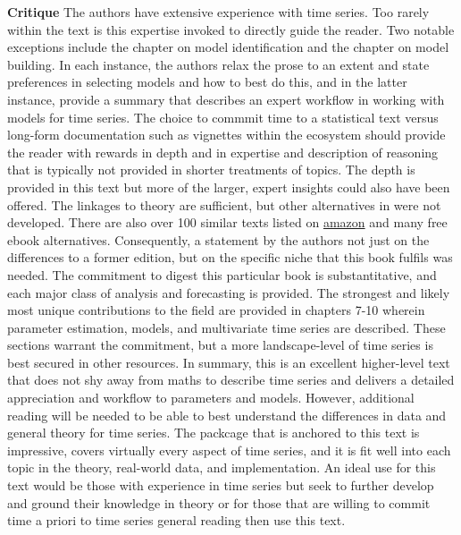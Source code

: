 \documentclass[bookreview]{jss}
\begin{document}
\textbf{Critique} \newline
The authors have extensive experience with time series. Too rarely within the text is this expertise invoked to directly guide the reader. Two notable exceptions include the chapter on model identification and the chapter on model building. In each instance, the authors relax the prose to an extent and state preferences in selecting models and how to best do this, and in the latter instance, provide a summary that describes an expert workflow in working with models for time series. The choice to commmit time to a statistical text versus long-form documentation such as vignettes within the  ecosystem should provide the reader with rewards in depth and in expertise and description of reasoning that is typically not provided in shorter treatments of topics. The depth is provided in this text but more of the larger, expert insights could also have been offered. The linkages to theory are sufficient, but other alternatives in  were not developed. There are also over 100 similar texts listed on \href{https://amazon.com}{amazon} and many free ebook alternatives. Consequently, a statement by the authors not just on the differences to a former edition, but on the specific niche that this book fulfils was needed. The commitment to digest this particular book is substantitative, and each major class of analysis and forecasting is provided. The strongest and likely most unique contributions to the field are provided in chapters 7-10 wherein parameter estimation, models, and multivariate time series are described. These sections warrant the commitment, but a more landscape-level of time series is best secured in other resources. In summary, this is an excellent higher-level text that does not shy away from maths to describe time series and delivers a detailed appreciation and workflow to parameters and models. However, additional reading will be needed to be able to best understand the differences in data and general theory for time series. The  packcage  that is anchored to this text is impressive, covers virtually every aspect of time series, and it is fit well into each topic in the theory, real-world data, and implementation. An ideal use for this text would be those with experience in time series but seek to further develop and ground their knowledge in theory or for those that are willing to commit time a priori to time series general reading then use this text.


\end{document}
